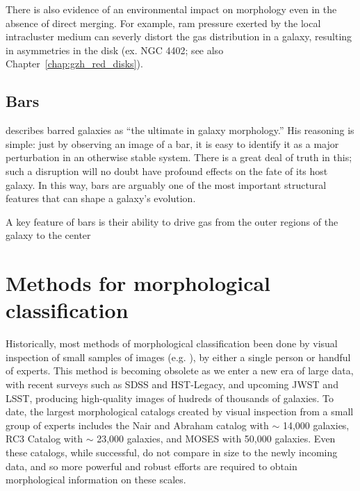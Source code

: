 There is also evidence of an environmental impact on morphology even in the absence of direct merging. For example, ram pressure \citep{Gunn1972} exerted by the local intracluster medium can severly distort the gas distribution in a galaxy, resulting in asymmetries in the disk (ex. NGC 4402; see also Chapter~\ref{chap:gzh_red_disks}).  

\subsection{Bars}
\citet{Buta2013} describes barred galaxies as ``the ultimate in galaxy morphology.'' His reasoning is simple: just by observing an image of a bar, it is easy to identify it as a major perturbation in an otherwise stable system. There is a great deal of truth in this; such a disruption will no doubt have profound effects on the fate of its host galaxy. In this way, bars are arguably one of the most important structural features that can shape a galaxy's evolution. 

A key feature of bars is their ability to drive gas from the outer regions of the galaxy to the center \citep{Athanassoula1992,Friedli1993,Ann2005,Kormendy2004,Athanassoula2005,Sellwood1993,Shlosman1989}


\section{Methods for morphological classification}

Historically, most methods of morphological classification been done by visual inspection of small samples of images (e.g. \citet{Hubble1926,Sandage1961,DeVaucouleurs1963,Block1994,Eskridge2002,Buta2010}), by either a single person or handful of experts. This method is becoming obsolete as we enter a new era of large data, with recent surveys such as SDSS and HST-Legacy, and upcoming JWST and LSST, producing high-quality images of hudreds of thousands of galaxies. To date, the largest morphological catalogs created by visual inspection from a small group of experts includes the Nair and Abraham catalog \citep{Nair2010} with $\sim$ 14,000 galaxies, RC3 Catalog \citep{RC31991} with $\sim$ 23,000 galaxies, and MOSES \citep{Schawinski2007} with 50,000 galaxies. Even these catalogs, while successful, do not compare in size to the newly incoming data, and so more powerful and robust efforts are required to obtain morphological information on these scales.

